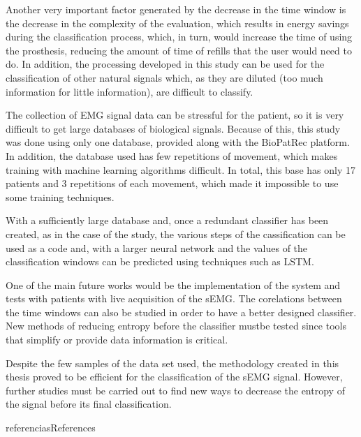 \documentclass[a4paper, 12pt]{ppgeb}
\begin{document}
Another very important factor generated by the decrease in the time window is the decrease in the complexity of the evaluation, which results in energy savings during the classification process, which, in turn, would increase the time of using the prosthesis, reducing the amount of time of refills that the user would need to do. In addition, the processing developed in this study can be used for the classification of other natural signals which, as they are diluted (too much information for little information), are difficult to classify.

The collection of \ac{EMG} signal data can be stressful for the patient, so it is very difficult to get large databases of biological signals. Because of this, this study was done using only one database, provided along with the BioPatRec platform. In addition, the database used has few repetitions of movement, which makes training with machine learning algorithms difficult. In total, this base has only 17 patients and 3 repetitions of each movement, which made it impossible to use some training techniques.

With a sufficiently large database and, once a redundant classifier has been created, as in the case of the study, the various steps of the cassification can be used as a code and, with a larger neural network and the values of the classification windows can be predicted using techniques such as \ac{LSTM}.

One of the main future works would be the implementation of the system and tests with patients with live acquisition of the \ac{sEMG}. The corelations between the time windows can also be studied in order to have a better designed classifier. New methods of reducing entropy before the classifier mustbe tested since tools that simplify or provide data information is critical.

Despite the few samples of the data set used, the methodology created in this thesis proved to be efficient for the classification of the \ac{sEMG} signal. However, further studies must be carried out to find new ways to decrease the entropy of the signal before its final classification.

\renewcommand\bibname{\Large\scshape References}
{referencias}{References}
\end{document}
